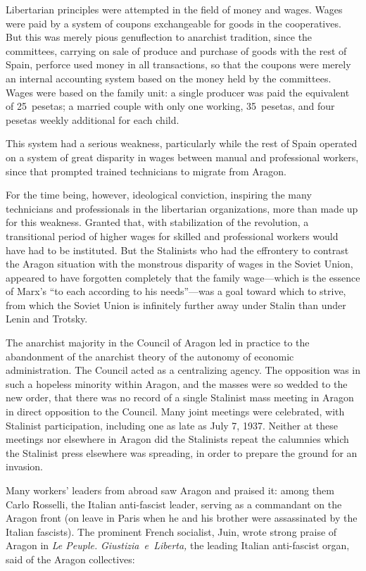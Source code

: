 Libertarian principles were attempted in the field of money and wages. Wages were paid by a system of coupons exchangeable for goods in the cooperatives. But this was merely pious genuflection to anarchist tradition, since the committees, carrying on sale of produce and purchase of goods with the rest of Spain, perforce used money in all transactions, so that the coupons were merely an internal accounting system based on the money held by the committees. Wages were based on the family unit: a single producer was paid the equivalent of 25~pesetas; a married couple with only one working, 35~pesetas, and four pesetas weekly additional for each child.

This system had a serious weakness, particularly while the rest of Spain operated on a system of great disparity in wages between manual and professional workers, since that prompted trained technicians to migrate from Aragon.

For the time being, however, ideological conviction, inspiring the many technicians and professionals in the libertarian organizations, more than made up for this weakness. Granted that, with stabilization of the revolution, a transitional period of higher wages for skilled and professional workers would have had to be instituted. But the Stalinists who had the effrontery to contrast the Aragon situation with the monstrous disparity of wages in the Soviet Union, appeared to have forgotten completely that the family wage---which is the essence of Marx’s ``to each according to his needs''---was a goal toward which to strive, from which the Soviet Union is infinitely further away under Stalin than under Lenin and Trotsky.

The anarchist majority in the Council of Aragon led in practice to the abandonment of the anarchist theory of the autonomy of economic administration. The Council acted as a centralizing agency. The opposition was in such a hopeless minority within Aragon, and the masses were so wedded to the new order, that there was no record of a single Stalinist mass meeting in Aragon in direct opposition to the Council. Many joint meetings were celebrated, with Stalinist participation, including one as late as July 7, 1937. Neither at these meetings nor elsewhere in Aragon did the Stalinists repeat the calumnies which the Stalinist press elsewhere was spreading, in order to prepare the ground for an invasion.

Many workers’ leaders from abroad saw Aragon and praised it: among them Carlo Rosselli, the Italian anti-fascist leader, serving as a commandant on the Aragon front (on leave in Paris when he and his brother were assassinated by the Italian fascists). The prominent French socialist, Juin, wrote strong praise of Aragon in \emph{Le Peuple.} \emph{Giustizia~e~Liberta,} the leading Italian anti-fascist organ, said of the Aragon collectives:


